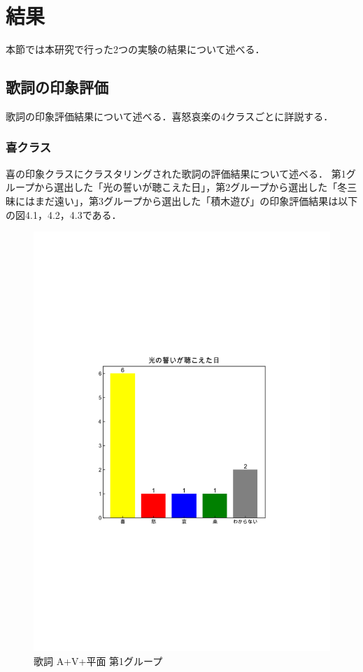 \section{結果}
本節では本研究で行った2つの実験の結果について述べる．

\subsection{歌詞の印象評価}
歌詞の印象評価結果について述べる．喜怒哀楽の4クラスごとに詳説する．
\subsubsection{喜クラス}
喜の印象クラスにクラスタリングされた歌詞の評価結果について述べる．
第1グループから選出した「光の誓いが聴こえた日」，第2グループから選出した「冬三昧にはまだ遠い」，第3グループから選出した「積木遊び」の印象評価結果は以下の図4.1，4.2，4.3である．
\newpage
\begin{figure}[H]
    \centering
    \includegraphics[width=14cm]{4313.pdf}
    \vspace{-1mm}
    \caption{歌詞 A+V+平面 第1グループ}
    \label{fig:mms}
    \vspace{5mm}
\end{figure}
